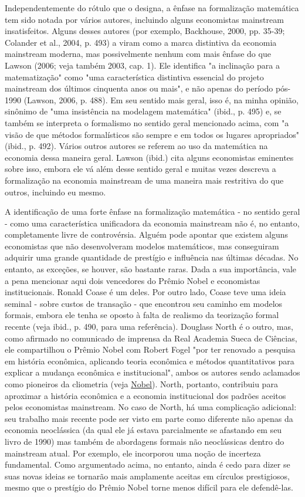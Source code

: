 \documentclass[12pt]{article}
\begin{document}
Independentemente do rótulo que o designa, a ênfase na formalização matemática tem sido notada por vários autores, incluindo alguns economistas mainstream insatisfeitos. Alguns desses autores (por exemplo, Backhouse, 2000, pp. 35-39; Colander et al., 2004, p. 493) a viram como a marca distintiva da economia mainstream moderna, mas possivelmente nenhum com mais ênfase do que Lawson (2006; veja também 2003, cap. 1). Ele identifica "a inclinação para a matematização" como "uma característica distintiva essencial do projeto mainstream dos últimos cinquenta anos ou mais", e não apenas do período pós-1990 (Lawson, 2006, p. 488). Em seu sentido mais geral, isso é, na minha opinião, sinônimo de "uma insistência na modelagem matemática" (ibid., p. 495) e, se também se interpreta o formalismo no sentido geral mencionado acima, com "a visão de que métodos formalísticos são sempre e em todos os lugares apropriados" (ibid., p. 492). Vários outros autores se referem ao uso da matemática na economia dessa maneira geral. Lawson (ibid.) cita alguns economistas eminentes sobre isso, embora ele vá além desse sentido geral e muitas vezes descreva a formalização na economia mainstream de uma maneira mais restritiva do que outros, incluindo eu mesmo.

A identificação de uma forte ênfase na formalização matemática - no sentido geral - como uma característica unificadora da economia mainstream não é, no entanto, completamente livre de controvérsia. Alguém pode apontar que existem alguns economistas que não desenvolveram modelos matemáticos, mas conseguiram adquirir uma grande quantidade de prestígio e influência nas últimas décadas. No entanto, as exceções, se houver, são bastante raras. Dada a sua importância, vale a pena mencionar aqui dois vencedores do Prêmio Nobel e economistas institucionais. Ronald Coase é um deles. Por outro lado, Coase teve uma ideia seminal - sobre custos de transação - que encontrou seu caminho em modelos formais, embora ele tenha se oposto à falta de realismo da teorização formal recente (veja ibid., p. 490, para uma referência). Douglass North é o outro, mas, como afirmado no comunicado de imprensa da Real Academia Sueca de Ciências, ele compartilhou o Prêmio Nobel com Robert Fogel "por ter renovado a pesquisa em história econômica, aplicando teoria econômica e métodos quantitativos para explicar a mudança econômica e institucional", ambos os autores sendo aclamados como pioneiros da cliometria (veja \href{http://nobelprize.org/nobel_prizes/economics/laureates/1993/press.html}{Nobel}). North, portanto, contribuiu para aproximar a história econômica e a economia institucional dos padrões aceitos pelos economistas mainstream. No caso de North, há uma complicação adicional: seu trabalho mais recente pode ser visto em parte como diferente não apenas da economia neoclássica (da qual ele já estava parcialmente se afastando em seu livro de 1990) mas também de abordagens formais não neoclássicas dentro do mainstream atual. Por exemplo, ele incorporou uma noção de incerteza fundamental. Como argumentado acima, no entanto, ainda é cedo para dizer se suas novas ideias se tornarão mais amplamente aceitas em círculos prestigiosos, mesmo que o prestígio do Prêmio Nobel torne menos difícil para ele defendê-las.
\end{document}
